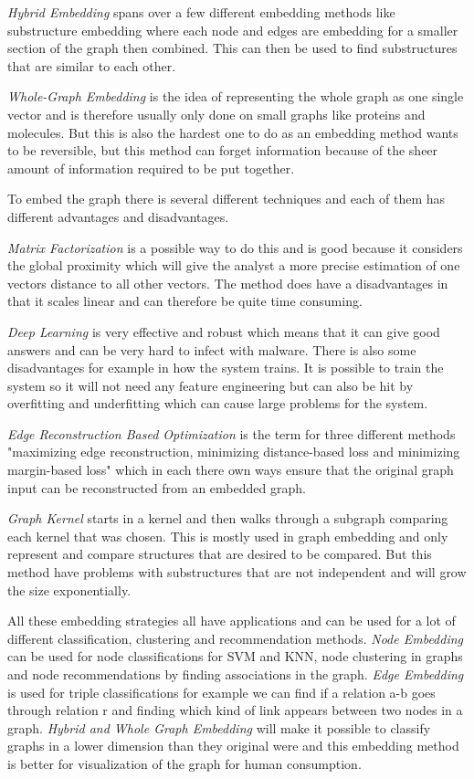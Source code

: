 \textit{Hybrid Embedding} spans over a few different embedding methods like substructure embedding where each node and edges are embedding for a smaller section of the graph then combined. This can then be used to find substructures that are similar to each other.

\textit{Whole-Graph Embedding} is the idea of representing the whole graph as one single vector and is therefore usually only done on small graphs like proteins and molecules. But this is also the hardest one to do as an embedding method wants to be reversible, but this method can forget information because of the sheer amount of information required to be put together.

To embed the graph there is several different techniques and each of them has different advantages and disadvantages.

\textit{Matrix Factorization} is a possible way to do this and is good because it considers the global proximity which will give the analyst a more precise estimation of one vectors distance to all other vectors. The method does have a disadvantages in that it scales linear and can therefore be quite time consuming.

\textit{Deep Learning} is very effective and robust which means that it can give good answers and can be very hard to infect with malware. There is also some disadvantages for example in how the system trains. It is possible to train the system so it will not need any feature engineering but can also be hit by overfitting and underfitting which can cause large problems for the system.

\textit{Edge Reconstruction Based Optimization} is the term for three different methods "maximizing edge reconstruction, minimizing distance-based loss and minimizing margin-based loss" which in each there own ways ensure that the original graph input can be reconstructed from an embedded graph.

\textit{Graph Kernel} starts in a kernel and then walks through a subgraph comparing each kernel that was chosen. This is mostly used in graph embedding and only represent and compare structures that are desired to be compared. But this method have problems with substructures that are not independent and will grow the size exponentially.

All these embedding strategies all have applications and can be used for a lot of different classification, clustering and recommendation methods. \textit{Node Embedding} can be used for node classifications for SVM and KNN, node clustering in graphs and node recommendations by finding associations in the graph. \textit{Edge Embedding} is used for triple classifications for example we can find if a relation a-b goes through relation r and finding which kind of link appears between two nodes in a graph. \textit{Hybrid and Whole Graph Embedding} will make it possible to classify graphs in a lower dimension than they original were and this embedding method is better for visualization of the graph for human consumption.